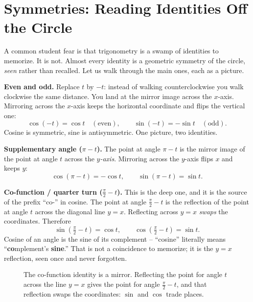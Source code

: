 \section{Symmetries: Reading Identities Off the Circle}
\label{ch04:identities}

A common student fear is that trigonometry is a swamp of identities to memorize. It is not. Almost every identity is a geometric symmetry of the circle, \emph{seen} rather than recalled. Let us walk through the main ones, each as a picture.

\textbf{Even and odd.} Replace $t$ by $-t$: instead of walking counterclockwise you walk clockwise the same distance. You land at the mirror image across the $x$-axis. Mirroring across the $x$-axis keeps the horizontal coordinate and flips the vertical one:
\[
  \cos(-t) = \cos t \quad(\text{even}),\qquad
  \sin(-t) = -\sin t \quad(\text{odd}).
\]
Cosine is symmetric, sine is antisymmetric. One picture, two identities.

\textbf{Supplementary angle ($\pi - t$).} The point at angle $\pi - t$ is the mirror image of the point at angle $t$ across the \emph{$y$-axis}. Mirroring across the $y$-axis flips $x$ and keeps $y$:
\[
  \cos(\pi - t) = -\cos t,\qquad \sin(\pi - t) = \sin t.
\]

\textbf{Co-function / quarter turn ($\tfrac{\pi}{2} - t$).} This is the deep one, and it is the source of the prefix ``co-'' in cosine. The point at angle $\tfrac{\pi}{2} - t$ is the reflection of the point at angle $t$ across the diagonal line $y = x$. Reflecting across $y=x$ \emph{swaps} the coordinates. Therefore
\[
  \sin\!\left(\tfrac{\pi}{2} - t\right) = \cos t,\qquad
  \cos\!\left(\tfrac{\pi}{2} - t\right) = \sin t.
\]
Cosine of an angle is the sine of its complement -- ``cosine'' literally means ``\textbf{co}mplement's \textbf{sine}.'' That is not a coincidence to memorize; it is the $y=x$ reflection, seen once and never forgotten.

\begin{figure}[H]
\centering
{}
\caption{The co-function identity is a mirror. Reflecting the point for angle $t$ across the line $y=x$ gives the point for angle $\tfrac{\pi}{2}-t$, and that reflection swaps the coordinates: $\sin$ and $\cos$ trade places.}
\label{ch04:fig-cofunction}
\end{figure}

